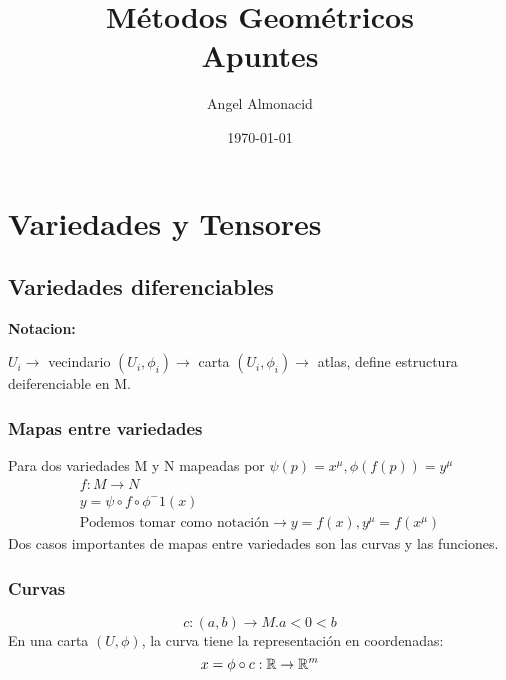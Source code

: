 \documentclass{report}
\title{\Huge{Métodos Geométricos}\\Apuntes}
\author{\huge{Angel Almonacid}}
\date{\today}
\begin{document}
  \maketitle
  \chapter{Variedades y Tensores}
  \section{Variedades diferenciables}
  \textbf{Notacion:}
  \begin{itemize}
    \ii $U_i \rightarrow$ vecindario
    \ii $(U_i,\phi_i)\rightarrow$ carta
    \ii ${(U_i, \phi_i)} \rightarrow$ atlas, define estructura deiferenciable en M.
  \end{itemize}

  
  \subsection{Mapas entre variedades}
  Para dos variedades M y N mapeadas por $\psi(p)={x^\mu}, \phi(f(p))={y^\mu}$
  \begin{gather*}
    f: M \rightarrow N\\
    y=\psi \circ f \circ \phi^-1(x)\\
    \text{Podemos tomar como notación}\rightarrow y=f(x), y^\mu=f(x^\mu)
  \end{gather*}
  Dos casos importantes de mapas entre variedades son las curvas y las funciones.
  \subsection*{Curvas}
  \[
    c: (a,b)\rightarrow M. a<0<b
  \]
  En una carta $(U,\phi)$, la curva tiene la representación en coordenadas:
  \[
    x=\phi \circ c : \mathbb{R} \rightarrow \mathbb{R}^m
  \]
\end{document}
